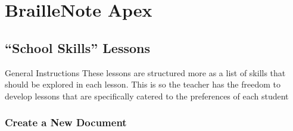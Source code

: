 \documentclass[10pt,letterpaper,twoside]{report}
\begin{document}
\tableofcontents
\part{BrailleNote Apex}
\chapter{``School Skills'' Lessons}
General Instructions
These lessons are structured more as a list of skills that should be explored in each lesson. This is so the teacher has the freedom to develop lessons that are specifically catered to the preferences of each student

\clearpage
\section{Create a New Document}
\end{document}
